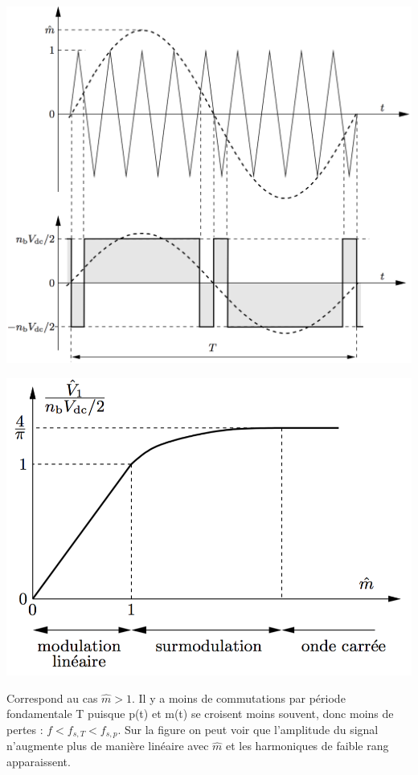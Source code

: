 \begin{center}
		\begin{minipage}{0.45\textwidth}
			\includegraphics[scale=0.25]{ch4/19}
		\end{minipage}
		\begin{minipage}{0.45\textwidth}
			\includegraphics[scale=0.4]{ch4/20}
			\label{fig:4.18}
		\end{minipage}
\end{center}

		Correspond au cas $\hat{m}>1$. Il y a moins de commutations par période fondamentale T puisque p(t) et m(t) se croisent moins souvent, donc moins de pertes : $f < f_{s,T} < f_{s,p}$. Sur la figure on peut voir que l'amplitude du signal n'augmente plus de manière linéaire avec $\hat{m}$ et les harmoniques de faible rang apparaissent. 
		
